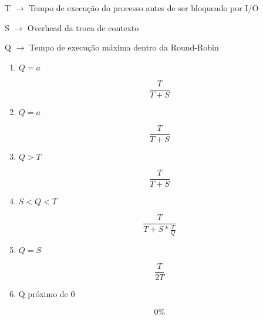 \begin{question}
  
    T $\rightarrow$ Tempo de execução do processo antes de ser bloqueado por I/O 

    S $\rightarrow$ Overhead da troca de contexto

    Q $\rightarrow$ Tempo de execução máxima dentro da Round-Robin

    \begin{enumerate}[label=\textbf{\alph*})]

        \item $ Q = a $
        
        \begin{equation*}
            \frac{T}{T+S}
        \end{equation*}
        
        \item $ Q = a $
        
        \begin{equation*}
            \frac{T}{T+S}
        \end{equation*}

        \item $ Q > T $
        
        \begin{equation*}
            \frac{T}{T+S}
        \end{equation*}

        \item $ S < Q < T $
        
        \begin{equation*}
            \frac{T}{T+S*\frac{T}{Q}}
        \end{equation*}

        \item $ Q = S $
        
        \begin{equation*}
            \frac{T}{2T}
        \end{equation*}

        \item Q próximo de 0
        
        \begin{equation*}
            0\%
        \end{equation*}

    \end{enumerate}

\end{question}
